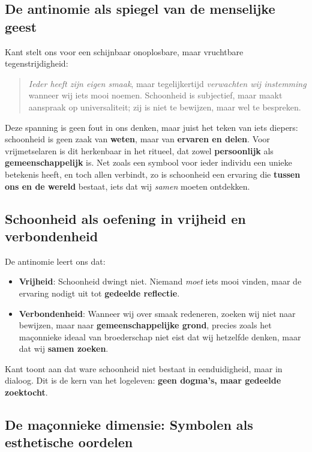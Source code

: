 \begin{mdframed}[leftmargin=0pt,rightmargin=0pt,backgroundcolor=blue!6,linecolor=white,innertopmargin=6pt,innerbottommargin=6pt]
\subsection*{De antinomie als spiegel van de menselijke geest}

Kant stelt ons voor een schijnbaar onoplosbare, maar vruchtbare tegenstrijdigheid:
\begin{quote}
\emph{Ieder heeft zijn eigen smaak}, maar tegelijkertijd \emph{verwachten wij instemming} wanneer wij iets mooi noemen. Schoonheid is subjectief, maar maakt aanspraak op universaliteit; zij is niet te bewijzen, maar wel te bespreken.
\end{quote}
Deze spanning is geen fout in ons denken, maar juist het teken van iets diepers: schoonheid is geen zaak van \textbf{weten}, maar van \textbf{ervaren en delen}. Voor vrijmetselaren is dit herkenbaar in het ritueel, dat zowel \textbf{persoonlijk} als \textbf{gemeenschappelijk} is. Net zoals een symbool voor ieder individu een unieke betekenis heeft, en toch allen verbindt, zo is schoonheid een ervaring die \textbf{tussen ons en de wereld} bestaat, iets dat wij \emph{samen} moeten ontdekken.

\subsection*{Schoonheid als oefening in vrijheid en verbondenheid}

De antinomie leert ons dat:
\begin{itemize}
    \item \textbf{Vrijheid}: Schoonheid dwingt niet. Niemand \emph{moet} iets mooi vinden, maar de ervaring nodigt uit tot \textbf{gedeelde reflectie}.
    \item \textbf{Verbondenheid}: Wanneer wij over smaak redeneren, zoeken wij niet naar bewijzen, maar naar \textbf{gemeenschappelijke grond}, precies zoals het maçonnieke ideaal van broederschap niet eist dat wij hetzelfde denken, maar dat wij \textbf{samen zoeken}.
\end{itemize}
Kant toont aan dat ware schoonheid niet bestaat in eenduidigheid, maar in dialoog. Dit is de kern van het logeleven: \textbf{geen dogma's, maar gedeelde zoektocht}.

\subsection*{De maçonnieke dimensie: Symbolen als esthetische oordelen}


\end{mdframed}
